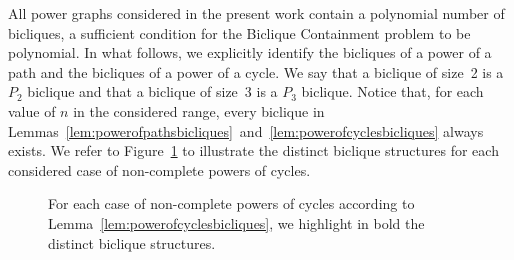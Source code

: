 \documentclass{article}
\begin{document}
All power graphs considered in the present work contain a polynomial
number of bicliques, a sufficient condition for the {\sc Biclique Containment}
problem to be polynomial. In what follows, we explicitly identify the bicliques
of a power of a path and the bicliques of a power of a cycle. 
We say that a biclique of size~2 is a $P_2$ biclique and that a biclique of size~3
is a $P_3$ biclique. Notice that, for each value of $n$ in the considered
range, every biclique in
Lemmas~\ref{lem:powerofpathsbicliques}~and~\ref{lem:powerofcyclesbicliques} always exists.
We refer to Figure~\ref{fig:l4} to illustrate the distinct biclique structures
for each considered case of non-complete powers of cycles.

\begin{figure}[t]
\centering
	\qquad
	\qquad
	\caption{For each case of non-complete powers of
	cycles according to Lemma~\ref{lem:powerofcyclesbicliques}, we highlight in
	bold the distinct biclique structures.}
	\label{fig:l4}
\end{figure}
	
\end{document}
